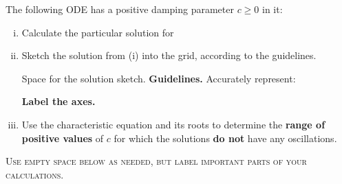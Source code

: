 \documentclass[10pt,twoside,sfsidenotes]{tufte-handout}
\begin{document}
\clearpage
\begin{question}
    The following ODE has a positive damping parameter \(c \geq 0\) in it:\vary{\[y''(x) + c y'(x) + 4 y(x) = 16\]}{\[y''(x) + c y'(x) + 9 y(x) = 18\]}

    \begin{enumerate}[(i)]
        \item Calculate the particular solution for 
        \item Sketch the solution from (i) into the grid, according to the guidelines.
            \begin{marginfigure}
                \centering
                Space for the solution sketch.
                \textbf{Guidelines.} Accurately represent:\\
                \textbf{Label the axes.}
            \end{marginfigure}
        \item Use the characteristic equation and its roots to determine the \textbf{range of positive values} of \(c\) for which the solutions \textbf{do not} have any oscillations.
    \end{enumerate}
    \begin{center}
        \textsc{\small Use empty space below as needed, but label important parts of your calculations.}
    \end{center}
\end{question}
\end{document}
